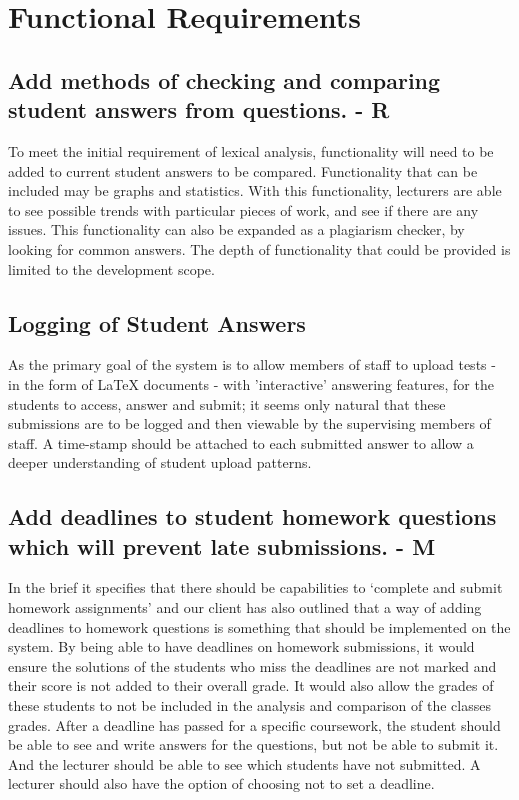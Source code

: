 \documentclass[12pt]{article}
\begin{document}
	\section{Functional Requirements}
	\subsection{Add methods of checking and comparing student answers from questions. - R}
	To meet the initial requirement of lexical analysis, functionality will need to be added to current student answers to be compared. Functionality that can be included may be graphs and statistics. With this functionality, lecturers are able to see possible trends with particular pieces of work, and see if there are any issues. This functionality can also be expanded as a plagiarism checker, by looking for common answers. The depth of functionality that could be provided is limited to the development scope.
	\subsection{Logging of Student Answers}
	As the primary goal of the system is to allow members of staff to upload tests - in the form of LaTeX documents - with 'interactive' answering features, for the students to access, answer and submit; it seems only natural that these submissions are to be logged and then viewable by the supervising members of staff. A time-stamp should be attached to each submitted answer to allow a deeper understanding of student upload patterns.
	\subsection{Add deadlines to student homework questions which will prevent late submissions. - M}
	In the brief it specifies that there should be capabilities to ‘complete and submit homework assignments’ and our client has also outlined that a way of adding deadlines to homework questions is something that should be implemented on the system.
By being able to have deadlines on homework submissions, it would ensure the solutions of the students who miss the deadlines are not marked and their score is not added to their overall grade. It would also allow the grades of these students to not be included in the analysis and comparison of the classes grades.
After a deadline has passed for a specific coursework, the student should be able to see and write answers for the questions, but not be able to submit it.  And the lecturer should be able to see which students have not submitted.
A lecturer should also have the option of choosing not to set a deadline.
\end{document}
